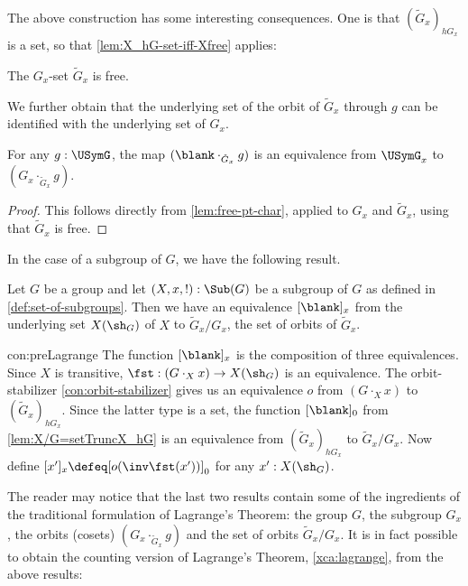 The above construction has some interesting consequences.
One is that $(\tilde G_x)_{hG_x}$ is a set, so that
\cref{lem:X_hG-set-iff-Xfree} applies:

\begin{corollary}\label{cor:action-subgrp-free}
The $G_x$-set $\tilde G_x$ is free.
\end{corollary}

We further obtain that the underlying set of the orbit 
of $\tilde G_x$ through $g$ can be identified with the
underlying set of $G_x$.

\begin{corollary}\label{lem:cosets-Gx.g}
  For any $g:\USymG$, the map $(\blank \cdot_{\tilde G_x} g)$ is
  an equivalence from $\USymG_x$ to $(G_x \cdot_{\tilde G_x} g)$.
\end{corollary} 
 
\begin{proof}
This follows directly from \cref{lem:free-pt-char}, 
applied to $G_x$ and $\tilde G_x$, using that $\tilde G_x$ is free.
\end{proof}

In the case of a subgroup of $G$, we have the following result.

\begin{construction}\label{con:preLagrange}
  Let $G$ be a group and let $(X,x,!):\Sub(G)$ be a subgroup of $G$ as defined
  in \cref{def:set-of-subgroups}. Then we have an equivalence
  $[\blank]_x$ from the underlying set $X(\sh_G)$ of $X$ to 
  $\tilde G_x /G_x$, the set of orbits of $\tilde G_x$. 
\end{construction}
\begin{implementation}{con:preLagrange}
The function $[\blank]_x$ is the composition of three equivalences.
Since $X$ is transitive, $\fst: (G\cdot_X x)\to X(\sh_G)$ is an equivalence.
The orbit-stabilizer \cref{con:orbit-stabilizer} gives us an equivalence $o$
from $(G\cdot_X x)$ to $(\tilde G_x)_{hG_x}$. Since the latter type is a set,
the function $[\blank]_0$ from \cref{lem:X/G=setTruncX_hG} 
is an equivalence from $(\tilde G_x)_{hG_x}$ to $\tilde G_x /G_x$.
Now define $[x']_x \defeq [o(\inv\fst(x'))]_0$ for any $x':X(\sh_G)$.
\end{implementation}

The reader may notice that the last two results contain some of
the ingredients of the traditional formulation of Lagrange's Theorem:
the group $G$, the subgroup $G_x$, the orbits 
(cosets) $(G_x \cdot_{\tilde G_x} g)$ 
and the set of orbits $\tilde G_x /G_x$.
It is in fact possible to obtain the counting version of
Lagrange's Theorem, \cref{xca:lagrange}, from the above results:

